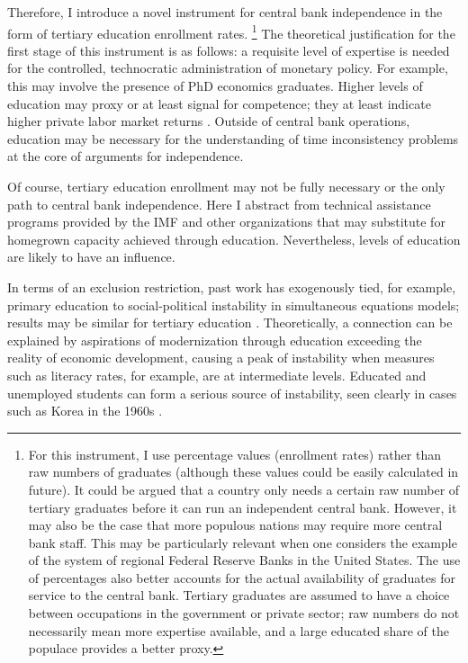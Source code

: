 \documentclass{article}
\begin{document}
    Therefore, I introduce a novel instrument for central bank independence in the form of tertiary education enrollment rates. \footnote{For this instrument, I use percentage values (enrollment rates) rather than raw numbers of graduates (although these values could be easily calculated in future). It could be argued that a country only needs a certain raw number of tertiary graduates before it can run an independent central bank. However, it may also be the case that more populous nations may require more central bank staff. This may be particularly relevant when one considers the example of the system of regional Federal Reserve Banks in the United States. The use of percentages also better accounts for the actual availability of graduates for service to the central bank. Tertiary graduates are assumed to have a choice between occupations in the government or private sector; raw numbers do not necessarily mean more expertise available, and a large educated share of the populace provides a better proxy.} The theoretical justification for the first stage of this instrument is as follows: a requisite level of expertise is needed for the controlled, technocratic administration of monetary policy. For example, this may involve the presence of PhD economics graduates. Higher levels of education may proxy or at least signal for competence; they at least indicate higher private labor market returns \citep{card_causal_1999}. Outside of central bank operations, education may be necessary for the understanding of time inconsistency problems at the core of arguments for independence.

    Of course, tertiary education enrollment may not be fully necessary or the only path to central bank independence. Here I abstract from technical assistance programs provided by the IMF and other organizations that may substitute for homegrown capacity achieved through education. Nevertheless, levels of education are likely to have an influence.

    In terms of an exclusion restriction, past work has exogenously tied, for example, primary education to social-political instability in simultaneous equations models; results may be similar for tertiary education \citep{alesina_income_1993}. Theoretically, a connection can be explained by aspirations of modernization through education exceeding the reality of economic development, causing a peak of instability when measures such as literacy rates, for example, are at intermediate levels. Educated and unemployed students can form a serious source of instability, seen clearly in cases such as Korea in the 1960s \citep[p.48]{huntington_political_1976}.
\end{document}
